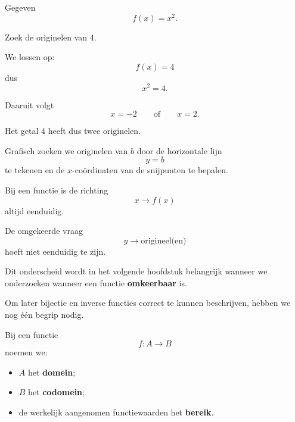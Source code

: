 \documentclass{ximera}
\begin{document}
\begin{voorbeeld}

Gegeven
\[
f(x)=x^2.
\]

Zoek de originelen van \(4\).

We lossen op:
\[
f(x)=4
\]
dus
\[
x^2=4.
\]

Daaruit volgt
\[
x=-2\qquad\text{of}\qquad x=2.
\]

Het getal \(4\) heeft dus twee originelen.

\begin{center}
\end{center}

Grafisch zoeken we originelen van \(b\) door de horizontale lijn
\[
y=b
\]
te tekenen en de \(x\)-coördinaten van de snijpunten te bepalen.
\end{voorbeeld}

\begin{opmerking}
Bij een functie is de richting
\[
x\longrightarrow f(x)
\]
altijd eenduidig.

De omgekeerde vraag
\[
y\longrightarrow \text{origineel(en)}
\]
hoeft niet eenduidig te zijn.

Dit onderscheid wordt in het volgende hoofdstuk belangrijk wanneer we onderzoeken
wanneer een functie \textbf{omkeerbaar} is.
\end{opmerking}



Om later bijectie en inverse functies correct te kunnen beschrijven,
hebben we nog één begrip nodig.

\begin{definitie}
Bij een functie
\[
f:A\to B
\]
noemen we:
\begin{itemize}
    \item \(A\) het \textbf{domein};
    \item \(B\) het \textbf{codomein};
    \item de werkelijk aangenomen functiewaarden het \textbf{bereik}.
\end{itemize}
\end{definitie}
\end{document}
